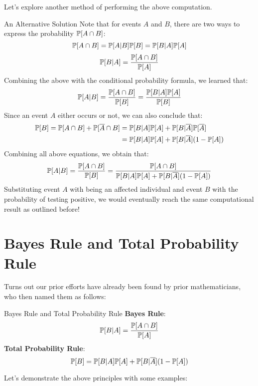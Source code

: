 Let's explore another method of performing the above computation.
\begin{ln-quest}{An Alternative Solution}{}
    Note that for events $A$ and $B$, there are two ways to express the probability $\P[A \cap B]$:
    \[\P[A \cap B] = \P[A|B] \P[B] = \P[B|A] \P[A]\]
    \[\P[B|A] = \frac{\P[A \cap B]}{\P[A]}\]
    Combining the above with the conditional probability formula, we learned that:
    \[\P[A|B] = \frac{\P[A \cap B]}{\P[B]} = \frac{\P[B|A] \P[A]}{\P[B]}\]
    Since an event $A$ either occurs or not, we can also conclude that:
    \begin{align*}
        \P[B] = \P[A \cap B] + \P[\overline{A} \cap B]
        &= \P[B|A] \P[A] + \P[B|\overline{A}] \P[\overline{A}] \\
        &= \P[B|A] \P[A] + \P[B|\overline{A}] (1 - \P[A])
    \end{align*}
    Combining all above equations, we obtain that:
    \[
        \P[A|B] = \frac{\P[A \cap B]}{\P[B]} = \frac{\P[A \cap B]}{\P[B|A] \P[A] + \P[B|\overline{A}] (1 - \P[A])}
    \]
    Substituting event $A$ with being an affected individual and event $B$ with the probability of testing positive, we would eventually reach the same computational result as outlined before!
\end{ln-quest}

\section{Bayes Rule and Total Probability Rule}
Turns out our prior efforts have already been found by prior mathematicians, who then named them as follows:
\begin{ln-define}[sidebyside]{Bayes Rule and Total Probability Rule}{}
    \textbf{Bayes Rule}:
    \[\P[B|A] = \frac{\P[A \cap B]}{\P[A]}\]
    \tcblower
    \textbf{Total Probability Rule}:
    \[\P[B] = \P[B|A] \P[A] + \P[B|\overline{A}] (1 - \P[A])\]
\end{ln-define}
Let's demonstrate the above principles with some examples:

